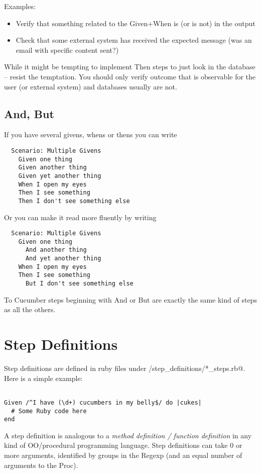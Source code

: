 \documentclass[10pt]{book}
\begin{document}
Examples:

\begin{itemize}
  \item Verify that something related to the Given+When is (or is not) in the output
  \item Check that some external system has received the expected message (was an email with specific content sent?)
\end{itemize}

While it might be tempting to implement Then steps to just look in the database -- resist the temptation. You should only verify outcome that is observable for the user (or external system) and databases usually are not.

\section{And, But}

If you have several givens, whens or thens you can write

\begin{verbatim}
  Scenario: Multiple Givens
    Given one thing
    Given another thing
    Given yet another thing
    When I open my eyes
    Then I see something
    Then I don't see something else

\end{verbatim}
Or you can make it read more fluently by writing

\begin{verbatim}
  Scenario: Multiple Givens
    Given one thing
      And another thing
      And yet another thing
    When I open my eyes
    Then I see something
      But I don't see something else

\end{verbatim}
To Cucumber steps beginning with And or But are exactly the same kind of steps as all the others.


\chapter{Step Definitions}

Step definitions are defined in ruby files under \verb@features/step_definitions/*_steps.rb@. Here is a simple example:

\begin{verbatim}

Given /^I have (\d+) cucumbers in my belly$/ do |cukes|
  # Some Ruby code here
end

\end{verbatim}
A step definition is analogous to a \emph{method definition /  function definition} in any kind of OO/procedural programming language. Step definitions can take 0 or more arguments, identified by groups in the Regexp (and an equal number of arguments to the Proc).
\end{document}
